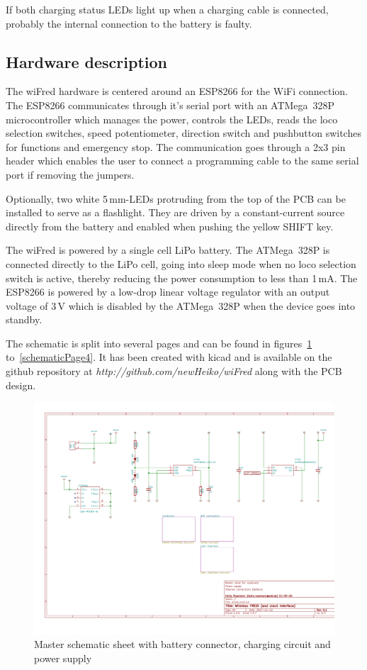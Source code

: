 \documentclass[11pt,a4paper]{scrartcl}
\begin{document}
If both charging status LEDs light up when a charging cable is connected, probably the internal connection to the battery is faulty.

\subsection{Hardware description}

The wiFred hardware is centered around an ESP8266 for the WiFi connection. The ESP8266 communicates through it's serial port with an ATMega~328P microcontroller which manages the power, controls the LEDs, reads the loco selection switches, speed potentiometer, direction switch and pushbutton switches for functions and emergency stop. The communication goes through a 2x3 pin header which enables the user to connect a programming cable to the same serial port if removing the jumpers.

Optionally, two white 5\,mm-LEDs protruding from the top of the PCB can be installed to serve as a flashlight. They are driven by a constant-current source directly from the battery and enabled when pushing the yellow SHIFT key.

The wiFred is powered by a single cell LiPo battery. The ATMega~328P is connected directly to the LiPo cell, going into sleep mode when no loco selection switch is active, thereby reducing the power consumption to less than 1\,mA. The ESP8266 is powered by a low-drop linear voltage regulator with an output voltage of 3\,V which is disabled by the ATMega~328P when the device goes into standby.

The schematic is split into several pages and can be found in figures~\ref{schematicPage1} to~\ref{schematicPage4}. It has been created with kicad and is available on the github repository at \textit{http://github.com/newHeiko/wiFred} along with the PCB design.

\begin{figure}[tbh]
  \centering
  \includegraphics[width=\textwidth]{images/wfred_rev2}
  \caption{Master schematic sheet with battery connector, charging circuit and power supply}
  \label{schematicPage1}
\end{figure}
\end{document}
